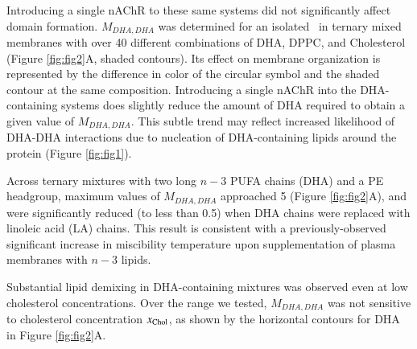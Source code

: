 	Introducing a single nAChR to these same systems did not significantly affect domain formation. $M_{DHA,DHA}$ was determined for an isolated \nachr~in ternary mixed membranes with over 40 different combinations of DHA, DPPC, and Cholesterol (Figure \ref{fig:fig2}A, shaded contours). Its effect on membrane organization is represented by the difference in color of the circular symbol and the shaded contour at the same composition.  Introducing a single nAChR into the DHA-containing systems does slightly reduce the amount of DHA required to obtain a given value of $M_{DHA,DHA}$. %
	{ This subtle trend} may reflect increased likelihood of DHA-DHA interactions due to nucleation of DHA-containing lipids around the protein (Figure \ref{fig:fig1}). 

	Across ternary mixtures with two long $n-3$ PUFA chains (DHA) and a PE headgroup, maximum values of $M_{DHA,DHA}$ approached 5 (Figure \ref{fig:fig2}A), and were significantly reduced (to less than 0.5) when DHA chains were replaced with linoleic acid (LA) chains. This result is consistent with a previously-observed significant increase in miscibility temperature upon supplementation of plasma membranes with $n-3$ lipids.  \cite{Levental_Polyunsaturated_2016} 
	
	Substantial lipid demixing in DHA-containing mixtures was observed even at low cholesterol concentrations. Over the range we tested, $M_{DHA,DHA}$ was not sensitive to cholesterol concentration $x_{\mathrm{Chol}}$, as shown by the horizontal contours for DHA in Figure \ref{fig:fig2}A.   

